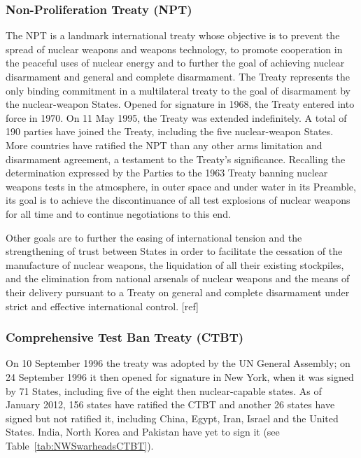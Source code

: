 \documentclass[twoside,titlepage,11pt,twocolumn,a4paper]{article}
\begin{document}
\subsubsection{Non-Proliferation Treaty (NPT)}
The NPT is a landmark international treaty whose objective is to
prevent the spread of nuclear weapons and weapons technology, to
promote cooperation in the peaceful uses of nuclear energy and to
further the goal of achieving nuclear disarmament and general and
complete disarmament. The Treaty represents the only binding
commitment in a multilateral treaty to the goal of disarmament by the
nuclear-weapon States. Opened for signature in 1968, the Treaty
entered into force in 1970. On 11 May 1995, the Treaty was extended
indefinitely. A total of 190 parties have joined the Treaty, including
the five nuclear-weapon States. More countries have ratified the NPT
than any other arms limitation and disarmament agreement, a testament
to the Treaty's significance. Recalling the determination expressed by
the Parties to the 1963 Treaty banning nuclear weapons tests in the
atmosphere, in outer space and under water in its Preamble, its goal
is to achieve the discontinuance of all test explosions of nuclear
weapons for all time and to continue negotiations to this end.

Other goals are to further the easing of international tension and the
strengthening of trust between States in order to facilitate the
cessation of the manufacture of nuclear weapons, the liquidation of
all their existing stockpiles, and the elimination from national
arsenals of nuclear weapons and the means of their delivery pursuant
to a Treaty on general and complete disarmament under strict and
effective international control. [ref]

\subsubsection{Comprehensive Test Ban Treaty (CTBT)}
On 10 September 1996 the treaty was adopted by the UN General
Assembly; on 24 September 1996 it then opened for signature in New
York, when it was signed by 71 States, including five of the eight
then nuclear-capable states. As of January 2012, 156 states have
ratified the CTBT and another 26 states have signed but not ratified
it, including China, Egypt, Iran, Israel and the United States. India,
North Korea and Pakistan have yet to sign it (see Table~\ref{tab:NWSwarheadsCTBT}).
\end{document}
